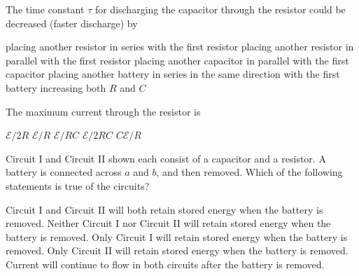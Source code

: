 \documentclass{../../../oss-apphys-exam}
\begin{document}
\begin{questions}
  \question The time constant $\tau$ for discharging the capacitor through the
  resistor could be decreased (faster discharge) by
  \label{switch1}
  \begin{choices}
    \choice placing another resistor in series with the first resistor
    \choice placing another resistor in parallel with the first resistor
    \choice placing another capacitor in parallel with the first capacitor
    \choice placing another battery in series in the same direction with the
    first battery
    \choice increasing both $R$ and $C$
  \end{choices}
  
  \question The maximum current through the resistor is
  \label{switch2}
  \begin{choices}
    \choice $\mathcal E/2R$
    \choice $\mathcal E/R$
    \choice $\mathcal E/RC$
    \choice $\mathcal E/2RC$
    \choice $C\mathcal E/R$
  \end{choices}
    
  \question Circuit I and Circuit II shown each consist of a capacitor and a
  resistor. A battery is connected across $a$ and $b$, and then removed. Which
  of the following statements is true of the circuits?
  \begin{center}
    \hspace{.5in}
  \end{center}
  \begin{choices}
    \choice Circuit I and Circuit II will both retain stored energy when the
    battery is removed.
    \choice Neither Circuit I nor Circuit II will retain stored energy when
    the battery is removed.
    \choice Only Circuit I will retain stored energy when the battery is
    removed.
    \choice Only Circuit II will retain stored energy when the battery is
    removed.
    \choice Current will continue to flow in both circuits after the battery
    is removed.
  \end{choices}
  \newpage
  

\end{questions}
\end{document}
